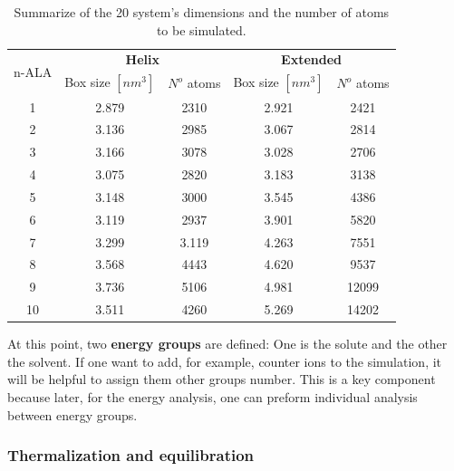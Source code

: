 \begin{table}[th] %
    \centering
    \begin{tabular}{c|cc|cc}
    \toprule
    \multirow{2}{4em}{n-ALA}           &   \multicolumn{2}{c|}{\textbf{Helix}} & \multicolumn{2}{c}{\textbf{Extended}}\\

    &   Box size $[nm^3]$ & $N^o$ atoms    &   Box size $[nm^3]$     &   $N^o$ atoms\\
    \midrule
    1         &   2.879  &   2310                  &   2.921                  &   2421\\
    2         &   3.136  &   2985                  &   3.067                   &   2814\\
    3         &   3.166  &   3078                  &   3.028                  &   2706\\
    4         &   3.075  &   2820                  &   3.183                  &   3138\\
    5         &   3.148  &   3000                  &   3.545                   &   4386\\
    6         &   3.119  &   2937                  &   3.901                   &   5820\\
    7         &   3.299  &   3.119                  &   4.263                   &   7551\\
    8         &   3.568  &   4443                  &   4.620                   &   9537\\
    9         &   3.736  &   5106                  &   4.981                  &   12099\\
    10         &   3.511  &   4260                  &   5.269                   &   14202\\
    \bottomrule
    \end{tabular}
    \caption{Summarize of the 20 system's dimensions and the number of atoms to be simulated.}
    \label{table:box_size}
\end{table}     

At this point, two \textbf{energy groups} are defined: One is the solute and the other the solvent. If one want to add, for example, counter ions to the simulation, it will be helpful to assign them other groups number. This is a key component because later, for the energy analysis, one can preform individual analysis between energy groups. 

\subsubsection{Thermalization and equilibration}

